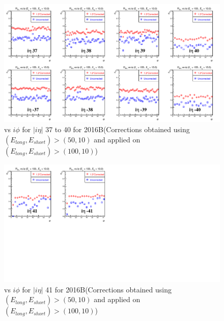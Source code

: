 \begin{figure}[h!]
\centering
\includegraphics[width=0.99\linewidth]{../Figures/Chap2/ImageFiles_HF/Ratio/2016/Corrected/EnergyCut10010/ieta37_40_E1E2Cut4Ietaiphi_Crrtd}
\caption{\ratiosl vs $i\phi$ for $|i\eta|$ 37 to 40 for 2016B(Corrections obtained using $(E_{long},E_{short})>(50,10)$ and applied on $(E_{long},E_{short})>(100,10)$)}
\label{fig:ieta37_40_E1E2Cut4Ietaiphi_Crrtd}
\end{figure}
\begin{figure}[h!]
\centering
\includegraphics[width=0.99\linewidth]{../Figures/Chap2/ImageFiles_HF/Ratio/2016/Corrected/EnergyCut10010/ieta41_E1E2Cut4Ietaiphi_Crrtd}
\caption{\ratiosl vs $i\phi$ for $|i\eta|$ 41 for 2016B(Corrections obtained using $(E_{long},E_{short})>(50,10)$ and applied on $(E_{long},E_{short})>(100,10)$)}
\label{fig:ieta41_E1E2Cut4Ietaiphi_Crrtd}
\end{figure}

